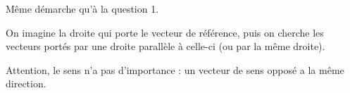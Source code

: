 \documentclass[border=4pt]{standalone}
\begin{document}
\begin{minipage}{8.5cm}\large \colorbox{orange!8}{\begin{minipage}{8.2cm}\par Même démarche qu'à la question 1.\par On imagine la droite qui porte le vecteur de référence, puis on cherche les vecteurs portés par une droite parallèle à celle-ci (ou par la même droite).\par Attention, le sens n'a pas d'importance : un vecteur de sens opposé a la même direction.\vspace{4pt}\end{minipage}}\end{minipage}
\end{document}
